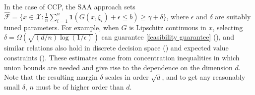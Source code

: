 \documentclass[mnsc,blindrev]{informs4} %
\begin{document}


\begin{example}
In the case of CCP, the SAA approach sets $\hat{\mathcal F}=\{x\in\mathcal X:
    \frac{1}{n}\sum_{i=1}^n\mathbf{1}(G(x,\xi_i)+\epsilon\leq b)\geq\gamma+\delta\}$,
where $\epsilon$ and $\delta$ are suitably tuned parameters. For example, when $G$ is Lipschitz continuous in $x$, selecting $   \delta= \Omega(\sqrt{(d/n)\log (1/\epsilon)})$ can guarantee \eqref{feasibility guarantee} (\cite{luedtke2008sample}), and similar relations also hold in discrete decision space (\cite{luedtke2008sample}) and expected value constraints (\cite{wang2008sample}). These estimates come from concentration inequalities in which union bounds are needed and give rise to the dependence on the dimension $d$. Note that the resulting margin $\delta$ scales in order $\sqrt d$, and to get any reasonably small $\delta$, $n$ must be of higher order than $d$.
\hfill\halmos
\end{example}
\end{document}
